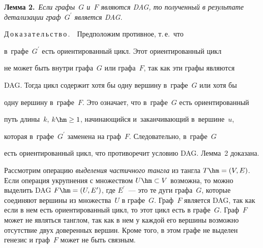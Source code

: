   


  \smallskip


  


  \noindent


  \textbf{Лемма 2.}\ \textit{Если графы~$G$ и~$F$ являются DAG, то полученный в результате детализации граф~$G^\prime$ является DAG.}


  


  \smallskip


  


  \noindent 


  Д\,о\,к\,а\,з\,а\,т\,е\,л\,ь\,с\,т\,в\,о\,.\ \ Предположим противное, т.\,е.\ что


  в~графе~$G^\prime$ есть ориентированный цикл. Этот ориентированный цикл 


  не может быть внутри графа~$G$ или графа~$F$, так как эти графы являются 


  DAG. Тогда цикл содержит хотя бы одну вершину в~графе~$G$ или хотя бы 


  одну вершину в~графе~$F$. Это означает, что в~графе~$G$ есть ориентированный 


  путь длины~$k$, $k\hm\geq 1$, начинающийся и~заканчивающий в~вершине~$u$, 


  которая в~графе~$G^\prime$ заменена на граф~$F$. Следовательно, в~графе~$G$ 


  есть ориентированный цикл, что противоречит условию DAG. Лемма~2 доказана.


  \smallskip


  


  Рассмотрим операцию \textit{выделения частичного тангла} из тангла $T\hm = (V, E)$. Если операция укрупнения с множеством $U\hm\subset V$ возможна, то можно выделить DAG $F \hm= (U, E^\prime)$, где $E^\prime$~--- это те дуги графа~$G$, которые соединяют вершины из множества~$U$ в графе~$G$. Граф~$F$ является DAG, так как если в нем есть ориентированный цикл, то этот цикл есть в графе~$G$. Граф~$F$ может не являться танглом, так как в нем у каждой его вершины возможно отсутствие двух доверенных вершин. Кроме того, в этом графе не выделен генезис и граф~$F$ может не быть связным. 


  \smallskip


  


  


